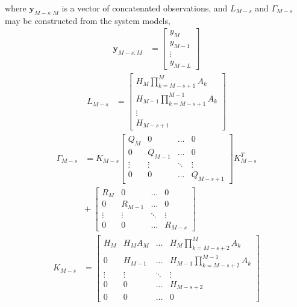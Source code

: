 \documentclass[twocolumn]{autart}    %
\begin{document}
where $\mathbf{y}_{M-s:M}$ is a vector of concatenated observations, and $L_{M-s}$ and $\Gamma_{M-s}$ may be constructed from the system models,
%
\begin{equation}
\begin{split}
\mathbf{y}_{M-s:M} & = \begin{bmatrix}y_M \\ y_{M-1} \\ \vdots \\ y_{M-L} \end{bmatrix}
\end{split}
\end{equation}
\begin{equation}
\begin{split}
L_{M-s} & = \begin{bmatrix} H_M \prod_{k=M-s+1}^{M} A_k \\ H_{M-1} \prod_{k=M-s+1}^{M-1} A_k \\ \vdots \\ H_{M-s+1} \end{bmatrix}
\end{split}
\end{equation}
\begin{equation}
\begin{split}
 \Gamma_{M-s} & = K_{M-s} \begin{bmatrix} Q_M & 0 & \dots & 0 \\ 0 & Q_{M-1} & \dots & 0 \\ \vdots & \vdots & \ddots & \vdots \\ 0 & 0 & \dots & Q_{M-s+1} \end{bmatrix} K_{M-s}^T \nonumber \\
  & + \: \begin{bmatrix} R_M & 0 & \dots & 0 \\ 0 & R_{M-1} & \dots & 0 \\ \vdots & \vdots & \ddots & \vdots \\ 0 & 0 & \dots & R_{M-s} \end{bmatrix} \nonumber
\end{split}
\end{equation}
\begin{equation}
\begin{split}
 K_{M-s} & = \begin{bmatrix} H_M & H_M A_M & \dots & H_M \prod_{k=M-s+2}^{M} A_k \\ 0 & H_{M-1} & \dots & H_{M-1} \prod_{k=M-s+2}^{M-1} A_k \\ \vdots & \vdots & \ddots & \vdots \\ 0 & 0 & \dots & H_{M-s+2} \\ 0 & 0 & \dots & 0 \end{bmatrix} \nonumber
\end{split}
\end{equation}
\end{document}
